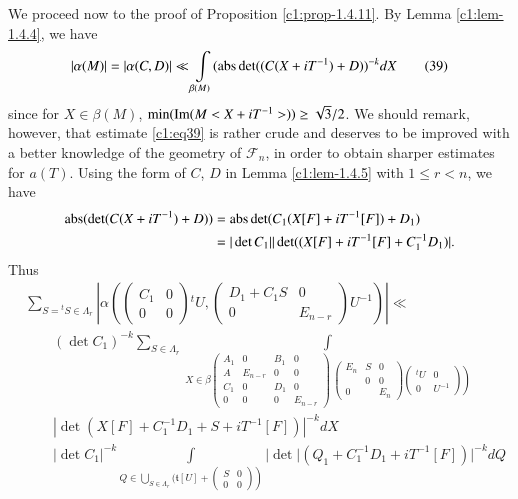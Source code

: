 We proceed now to the proof of Proposition \ref{c1:prop-1.4.11}. By Lemma
\ref{c1:lem-1.4.4}, we have
\begin{equation*}
|\alpha(M)|=|\alpha(C,D)|\ll\int\limits_{\beta(M)}(\operatorname{abs} \det
((C(X+iT^{-1})+D))^{-k}dX\tag{39}\label{c1:eq39}
\end{equation*}
since for $X\in\beta(M)$, $\min(\operatorname{Im}(M<X+iT^{-1}>))\geq
\sqrt{3}/2$. We should remark, however, that estimate \eqref{c1:eq39} is
rather crude and deserves to be improved with a better knowledge of
the geometry of $\mathcal{F}_{n}$, in order to obtain sharper
estimates for $a(T)$. Using the form of $C$, $D$ in Lemma
\ref{c1:lem-1.4.5} with $1\leq r<n$, we have
\begin{align*}
\operatorname{abs}(\det (C(X+iT^{-1})+D)) &= \operatorname{abs}
\det(C_{1}(X[F]+iT^{-1}[F])+D_{1})\\
&= |\det C_{1}||\det ((X[F]+iT^{-1}[F]+C^{-1}_{1}D_{1})|.
\end{align*}
Thus\pageoriginale
\begin{align*}
& \sum_{S={}^{t}S\in\Lambda_{r}}|\alpha\left(
\begin{pmatrix}
C_{1} & 0\\ 0 & 0
\end{pmatrix}
{}^tU, 
\begin{pmatrix}
D_{1}+C_{1}S & 0\\
0 & E_{n-r}
\end{pmatrix}
U^{-1}\right)|\ll\\
&\qquad (\det C_{1})^{-k}\sum_{S\in\Lambda_{r}}
\int\limits_{X\in \beta
\begin{pmatrix}
A_{1} & 0 & B_{1} & 0\\
A & E_{n-r} & 0 & 0\\
C_{1} & 0 & D_{1} & 0\\
0 & 0 & 0 & E_{n-r}
\end{pmatrix} \; 
\begin{pmatrix}
E_{n} & S & 0\\
 & 0 & 0\\
0 & & E_{n}
\end{pmatrix}
\left.
\begin{pmatrix}
{}^{t}U & 0\\
0 & U^{-1}
\end{pmatrix}
\right)
}\\
& \qquad |\det(X[F]+C^{-1}_{1}D_{1}+S+iT^{-1}[F])|^{-k}dX\\
&\qquad |\det
C_{1}|^{-k}\int\limits_{Q\in\bigcup\limits_{S\in\Lambda_{r}}(\mathfrak{t}[U]+
\left.
\begin{pmatrix}
S & 0\\
0 & 0
\end{pmatrix}
\right)}|\det|(Q_{1}+C^{-1}_{1}D_{1}+iT^{-1}[F])|^{-k}dQ\tag{40}\label{c1:eq40}
\end{align*}
